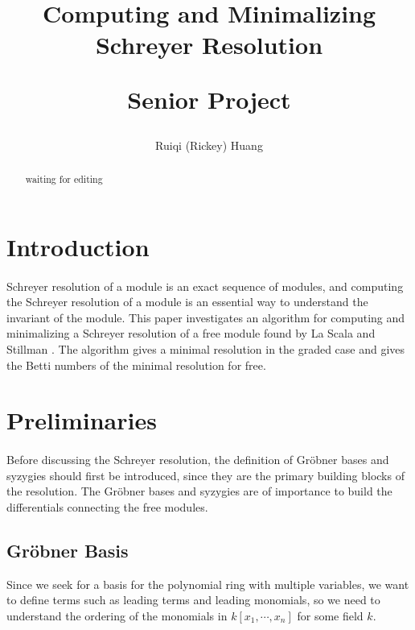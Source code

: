 \documentclass{article}
\title{Computing and Minimalizing Schreyer Resolution\\
\begin{large} 
  Senior Project
\end{large}}
\author{Ruiqi (Rickey) Huang}
\theoremstyle{definition}
\theoremstyle{remark}
\theoremstyle{example}
\begin{document}
\maketitle

\begin{abstract}
    \textcolor{BrickRed}{waiting for editing}
\end{abstract}

\section{Introduction}

\paragraph{  }

Schreyer resolution of a module is an exact sequence of modules, and computing the Schreyer resolution of a module is an essential way to understand the invariant of the module. This paper investigates an algorithm for computing and minimalizing a Schreyer resolution of a free module found by La Scala and Stillman \cite{la_scala_strategies_1998}. The algorithm gives a minimal resolution in the graded case and gives the Betti numbers of the minimal resolution for free.

\section{Preliminaries}

\paragraph{  }

Before discussing the Schreyer resolution, the definition of Gröbner bases and syzygies should first be introduced, since they are the primary building blocks of the resolution. The Gröbner bases and syzygies are of importance to build the differentials connecting the free modules.

\subsection{Gröbner Basis}

Since we seek for a basis for the polynomial ring with multiple variables, we want to define terms such as leading terms and leading monomials, so we need to understand the ordering of the monomials in $k[x_1,\cdots,x_n]$ for some field $k$.
\end{document}
